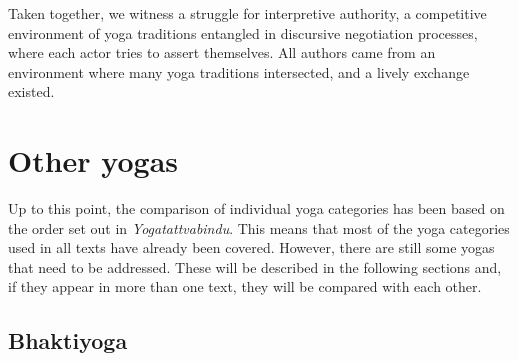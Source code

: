Taken together, we witness a struggle for interpretive authority, a competitive environment of yoga traditions entangled in discursive negotiation processes, where each actor tries to assert themselves. All authors came from an environment where many yoga traditions intersected, and a lively exchange existed.
%
\section{Other yogas}

Up to this point, the comparison of individual yoga categories has been based on the order set out in \emph{Yogatattvabindu}. This means that most of the yoga categories used in all texts have already been covered. However, there are still some yogas that need to be addressed. These will be described in the following sections and, if they appear in more than one text, they will be compared with each other.

\subsection{Bhaktiyoga}
\label{bhaktiyogaintro}

